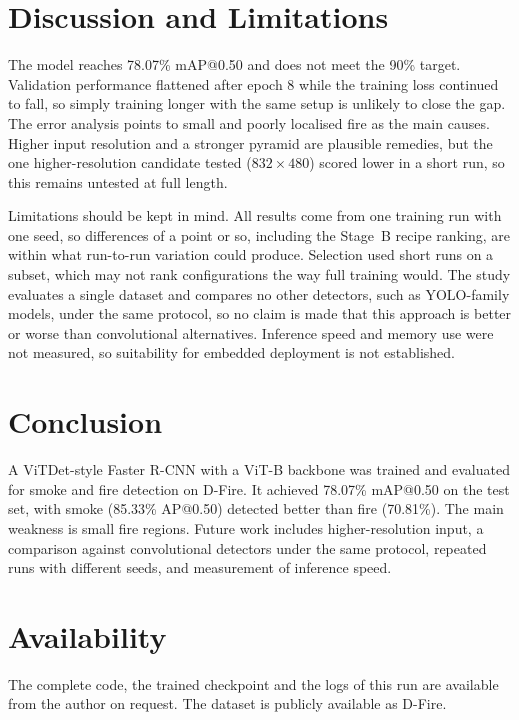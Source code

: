 \documentclass[conference]{IEEEtran}
\begin{document}
\section{Discussion and Limitations}
The model reaches 78.07\% mAP@0.50 and does not meet the 90\% target. Validation performance flattened after epoch 8 while the training loss continued to fall, so simply training longer with the same setup is unlikely to close the gap. The error analysis points to small and poorly localised fire as the main causes. Higher input resolution and a stronger pyramid are plausible remedies, but the one higher-resolution candidate tested ($832\times480$) scored lower in a short run, so this remains untested at full length.

Limitations should be kept in mind. All results come from one training run with one seed, so differences of a point or so, including the Stage~B recipe ranking, are within what run-to-run variation could produce. Selection used short runs on a subset, which may not rank configurations the way full training would. The study evaluates a single dataset and compares no other detectors, such as YOLO-family models, under the same protocol, so no claim is made that this approach is better or worse than convolutional alternatives. Inference speed and memory use were not measured, so suitability for embedded deployment is not established.

\section{Conclusion}
A ViTDet-style Faster R-CNN with a ViT-B backbone was trained and evaluated for smoke and fire detection on D-Fire. It achieved 78.07\% mAP@0.50 on the test set, with smoke (85.33\% AP@0.50) detected better than fire (70.81\%). The main weakness is small fire regions. Future work includes higher-resolution input, a comparison against convolutional detectors under the same protocol, repeated runs with different seeds, and measurement of inference speed.

\section*{Availability}
The complete code, the trained checkpoint and the logs of this run are available from the author on request. The dataset is publicly available as D-Fire.
\end{document}
